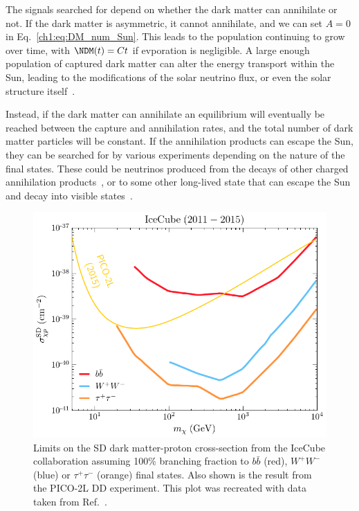The signals searched for depend on whether the dark matter can annihilate or not. If the dark matter is asymmetric, it cannot annihilate, and we can set $A = 0$ in Eq.~\ref{ch1:eq:DM_num_Sun}. This leads to the population continuing to grow over time, with $\NDM(t) = Ct$ if evporation is negligible. A large enough population of captured dark matter can alter the energy transport within the Sun, leading to the modifications of the solar neutrino flux, or even the solar structure itself~\cite{Franarin:2018gfk_jun_JUNOSensitivityResonant, Cumberbatch:2010hh_LightWIMPsSun, Vincent:2013lua_apr_Thermalconductiondark,Vincent:2015gqa_aug_Generalisedformfactor}. 

Instead, if the dark matter can annihilate an equilibrium will eventually be reached between the capture and annihilation rates, and the total number of dark matter particles will be constant. If the annihilation products can escape the Sun, they can be searched for by various experiments depending on the nature of the final states.
These could be neutrinos produced from the decays of other charged annihilation products~\cite{Super-Kamiokande:2011wjy_IndirectSearchWIMPs,Super-Kamiokande:2015xms_apr_Searchneutrinosannihilation,ANTARES:2016obx_may_SearchSecludedDark,ANTARES:2016xuh_aug_LimitsDarkMatter,IceCube:2016dgk_Searchannihilatingdark}, or to some other long-lived state that can escape the Sun and decay into visible states~\cite{Batell:2009zp_SolarGammaRays,Schuster:2009au_TerrestrialSolarLimits,Bell:2011sn_Enhancedneutrinosignals,Feng:2016ijc_jun_DarkSunshineDetecting,Leane:2017vag_jun_PowerfulSolarSignatures}.


\begin{figure}[!t]
    \centering
    \includegraphics{IceCube_2016.pdf}
    \caption{Limits on the SD dark matter-proton cross-section from the IceCube collaboration assuming 100\% branching fraction to $b\bar{b}$ (red), $W^+ W^-$ (blue) or $\tau^+ \tau^-$ (orange) final states. Also shown is the result from the PICO-2L DD experiment. This plot was recreated with data taken from Ref.~\cite{IceCube:2016dgk_mar_Searchannihilatingdark}.}
    \label{ch1:fig:IceCube_2016_SD}
\end{figure}

